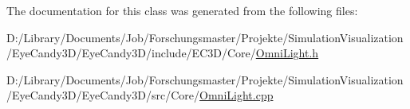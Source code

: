 The documentation for this class was generated from the following files\+:\begin{DoxyCompactItemize}
\item 
D\+:/\+Library/\+Documents/\+Job/\+Forschungsmaster/\+Projekte/\+Simulation\+Visualization/\+Eye\+Candy3\+D/\+Eye\+Candy3\+D/include/\+E\+C3\+D/\+Core/\mbox{\hyperlink{_omni_light_8h}{Omni\+Light.\+h}}\item 
D\+:/\+Library/\+Documents/\+Job/\+Forschungsmaster/\+Projekte/\+Simulation\+Visualization/\+Eye\+Candy3\+D/\+Eye\+Candy3\+D/src/\+Core/\mbox{\hyperlink{_omni_light_8cpp}{Omni\+Light.\+cpp}}\end{DoxyCompactItemize}
